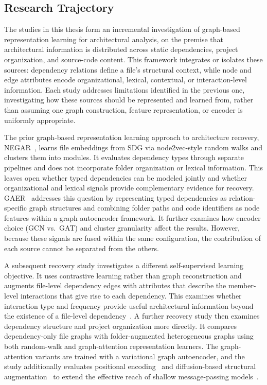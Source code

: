 \subsection{Research Trajectory \label{sec:research_traj}}

The studies in this thesis form an incremental investigation of graph-based representation learning for architectural analysis, on the premise that architectural information is distributed across static dependencies, project organization, and source-code content. This framework integrates or isolates these sources: dependency relations define a file's structural context, while node and edge attributes encode organizational, lexical, contextual, or interaction-level information. Each study addresses limitations identified in the previous one, investigating how these sources should be represented and learned from, rather than assuming one graph construction, feature representation, or encoder is uniformly appropriate.

The prior graph-based representation learning approach to architecture recovery, NEGAR~\cite{negar}, learns file embeddings from SDG via node2vec-style random walks and clusters them into modules. It evaluates dependency types through separate pipelines and does not incorporate folder organization or lexical information. This leaves open whether typed dependencies can be modeled jointly and whether organizational and lexical signals provide complementary evidence for recovery. GAER~\cite{gaer} addresses this question by representing typed dependencies as relation-specific graph structures and combining folder paths and code identifiers as node features within a graph autoencoder framework. It further examines how encoder choice (GCN vs.\ GAT) and cluster granularity affect the results. However, because these signals are fused within the same configuration, the contribution of each source cannot be separated from the others.

A subsequent recovery study investigates a different self-supervised learning objective. It uses contrastive learning rather than graph reconstruction and augments file-level dependency edges with attributes that describe the member-level interactions that give rise to each dependency. This examines whether interaction type and frequency provide useful architectural information beyond the existence of a file-level dependency~\cite{arl_2026}. A further recovery study then examines dependency structure and project organization more directly. It compares dependency-only file graphs with folder-augmented heterogeneous graphs using both random-walk and graph-attention representation learners. The graph-attention variants are trained with a variational graph autoencoder, and the study additionally evaluates positional encoding~\cite{lpe} and diffusion-based structural augmentation~\cite{gdc} to extend the effective reach of shallow message-passing models~\cite{structsar}.


